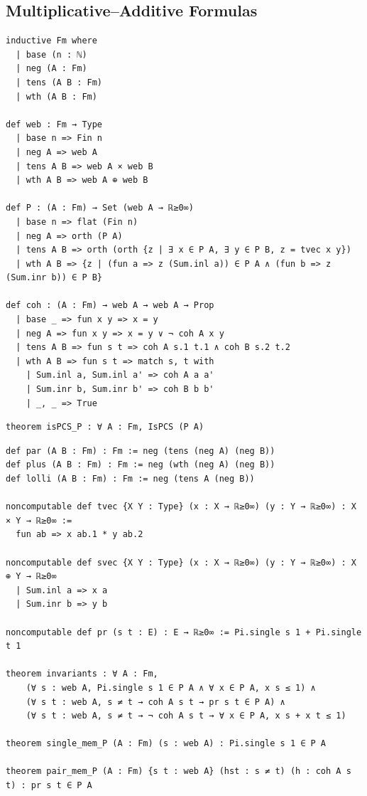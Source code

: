 \subsection{Multiplicative--Additive Formulas}

\label{lean:linear-fm}
\begin{lstlisting}
inductive Fm where
  | base (n : ℕ)
  | neg (A : Fm)
  | tens (A B : Fm)
  | wth (A B : Fm)

def web : Fm → Type
  | base n => Fin n
  | neg A => web A
  | tens A B => web A × web B
  | wth A B => web A ⊕ web B

def P : (A : Fm) → Set (web A → ℝ≥0∞)
  | base n => flat (Fin n)
  | neg A => orth (P A)
  | tens A B => orth (orth {z | ∃ x ∈ P A, ∃ y ∈ P B, z = tvec x y})
  | wth A B => {z | (fun a => z (Sum.inl a)) ∈ P A ∧ (fun b => z (Sum.inr b)) ∈ P B}

def coh : (A : Fm) → web A → web A → Prop
  | base _ => fun x y => x = y
  | neg A => fun x y => x = y ∨ ¬ coh A x y
  | tens A B => fun s t => coh A s.1 t.1 ∧ coh B s.2 t.2
  | wth A B => fun s t => match s, t with
    | Sum.inl a, Sum.inl a' => coh A a a'
    | Sum.inr b, Sum.inr b' => coh B b b'
    | _, _ => True
\end{lstlisting}

\label{lean:ispcs-p}
\begin{lstlisting}
theorem isPCS_P : ∀ A : Fm, IsPCS (P A)
\end{lstlisting}

\label{lean:linear-invariants}
\begin{lstlisting}
def par (A B : Fm) : Fm := neg (tens (neg A) (neg B))
def plus (A B : Fm) : Fm := neg (wth (neg A) (neg B))
def lolli (A B : Fm) : Fm := neg (tens A (neg B))

noncomputable def tvec {X Y : Type} (x : X → ℝ≥0∞) (y : Y → ℝ≥0∞) : X × Y → ℝ≥0∞ :=
  fun ab => x ab.1 * y ab.2

noncomputable def svec {X Y : Type} (x : X → ℝ≥0∞) (y : Y → ℝ≥0∞) : X ⊕ Y → ℝ≥0∞
  | Sum.inl a => x a
  | Sum.inr b => y b

noncomputable def pr (s t : E) : E → ℝ≥0∞ := Pi.single s 1 + Pi.single t 1

theorem invariants : ∀ A : Fm,
    (∀ s : web A, Pi.single s 1 ∈ P A ∧ ∀ x ∈ P A, x s ≤ 1) ∧
    (∀ s t : web A, s ≠ t → coh A s t → pr s t ∈ P A) ∧
    (∀ s t : web A, s ≠ t → ¬ coh A s t → ∀ x ∈ P A, x s + x t ≤ 1)

theorem single_mem_P (A : Fm) (s : web A) : Pi.single s 1 ∈ P A

theorem pair_mem_P (A : Fm) {s t : web A} (hst : s ≠ t) (h : coh A s t) : pr s t ∈ P A
\end{lstlisting}

